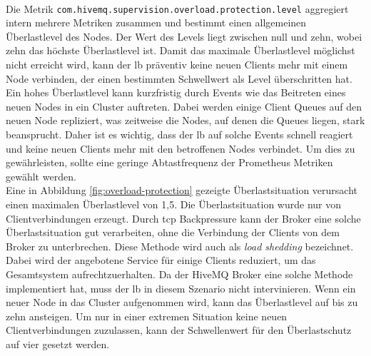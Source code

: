 \\
Die Metrik \verb|com.hivemq.supervision.overload.protection.level| aggregiert intern mehrere Metriken zusammen und bestimmt einen allgemeinen Überlastlevel des Nodes. Der Wert des Levels liegt zwischen null und zehn, wobei zehn das höchste Überlastlevel ist.
Damit das maximale Überlastlevel möglichst nicht erreicht wird, kann der \acl{lb} präventiv keine neuen Clients mehr mit einem Node verbinden, der einen bestimmten Schwellwert als Level überschritten hat.
\\
Ein hohes Überlastlevel kann kurzfristig durch Events wie das Beitreten eines neuen Nodes in ein Cluster auftreten. Dabei werden einige Client Queues auf den neuen Node repliziert, was zeitweise die Nodes, auf denen die Queues liegen, stark beansprucht. Daher ist es wichtig, dass der \ac{lb} auf solche Events schnell reagiert und keine neuen Clients mehr mit den betroffenen Nodes verbindet.
Um dies zu gewährleisten, sollte eine geringe Abtastfrequenz der Prometheus Metriken gewählt werden.
\\
Eine in Abbildung \ref{fig:overload-protection} gezeigte Überlastsituation verursacht einen maximalen Überlastlevel von 1,5.
Die Überlastsituation wurde nur von Clientverbindungen erzeugt. Durch \ac{tcp} Backpressure kann der Broker eine solche Überlastsituation gut verarbeiten, ohne die Verbindung der Clients von dem Broker zu unterbrechen.
Diese Methode wird auch als \textit{load shedding} bezeichnet. Dabei wird der angebotene Service für einige Clients reduziert, um das Gesamtsystem aufrechtzuerhalten.
Da der HiveMQ Broker eine solche Methode implementiert hat, muss der \acl{lb} in diesem Szenario nicht intervinieren.
Wenn ein neuer Node in das Cluster aufgenommen wird, kann das Überlastlevel auf bis zu zehn ansteigen.
Um nur in einer extremen Situation keine neuen Clientverbindungen zuzulassen, kann der Schwellenwert für den Überlastschutz auf vier gesetzt werden.
\\
